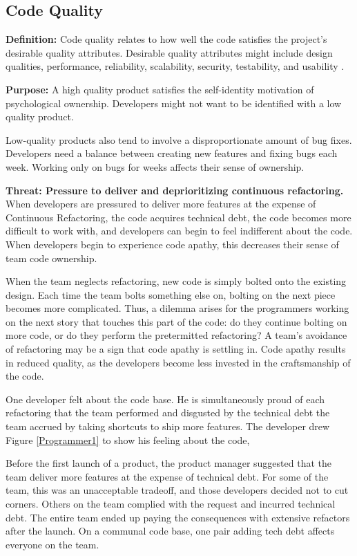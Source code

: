 \subsection{Code Quality}
\textbf{Definition:} Code quality relates to how well the code satisfies the project's desirable quality attributes. Desirable quality attributes might include design qualities, performance, reliability, scalability, security,  testability, and usability \cite{Meier2009}. 

\textbf{Purpose:} A high quality product satisfies the self-identity motivation of psychological ownership. Developers might not want to be identified with a low quality product.

Low-quality products also tend to involve a disproportionate amount of bug fixes. Developers need a balance between creating new features and fixing bugs each week. Working only on bugs for weeks affects their sense of ownership.    

\textbf{Threat: Pressure to deliver and deprioritizing continuous refactoring.} When developers are pressured to deliver more features at the expense of Continuous Refactoring, the code acquires technical debt, the code becomes more difficult to work with, and developers can begin to feel indifferent about the code. When developers begin to experience code apathy, this decreases their sense of team code ownership. 

When the team neglects refactoring, new code is simply bolted onto the existing design. Each time the team bolts something else on, bolting on the next piece becomes more complicated. Thus, a dilemma arises for the programmers working on the next story that touches this part of the code: do they continue bolting on more code, or do they perform the pretermitted refactoring? A team's avoidance of refactoring may be a sign that code apathy is settling in. Code apathy results in reduced quality, as the developers become less invested in the craftsmanship of the code.

One developer felt  about the code base. He is simultaneously proud of each refactoring that the team performed and disgusted by the technical debt the team accrued by taking shortcuts to ship more features. The developer drew Figure \ref{Programmer1} to show his feeling about the code, 

Before the first launch of a product, the product manager suggested that the team deliver more features at the expense of technical debt. For some of the team, this was an unacceptable tradeoff, and those developers decided not to cut corners. Others on the team complied with the request and incurred technical debt. The entire team ended up paying the consequences with extensive refactors after the launch. On a communal code base, one pair adding tech debt affects everyone on the team.

